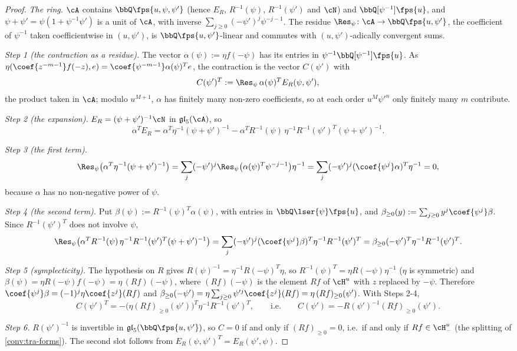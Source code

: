 \begin{proof}
\emph{The ring.} $\cA$ contains $\bbQ\fps{u,\psi,\psi'}$ (hence $E_R$, $R^{-1}(\psi)$, $R^{-1}(\psi')$ and $\cN$) and $\bbQ[\psi^{-1}]\fps{u}$, and $\psi+\psi' = \psi(1+\psi^{-1}\psi')$ is a unit of $\cA$, with inverse $\sum_{j\geq 0}(-\psi')^j\psi^{-j-1}$. The residue $\Res_\psi\colon\cA\to\bbQ\fps{u,\psi'}$, the coefficient of $\psi^{-1}$ taken coefficientwise in $(u,\psi')$, is $\bbQ\fps{u,\psi'}$-linear and commutes with $(u,\psi')$-adically convergent sums.

\emph{Step 1 (the contraction as a residue).} The vector $\alpha(\psi) := \eta f(-\psi)$ has its entries in $\psi^{-1}\bbQ[\psi^{-1}]\fps{u}$. As $\eta(\coef{z^{-m-1}}f(-z),e) = \coef{\psi^{-m-1}}\alpha(\psi)^Te$, the contraction is the vector $C(\psi')$ with
\[
C(\psi')^T := \Res_\psi\,\alpha(\psi)^TE_R(\psi,\psi'),
\]
the product taken in $\cA$; modulo $u^{M+1}$, $\alpha$ has finitely many non-zero coefficients, so at each order $u^M\psi'^n$ only finitely many $m$ contribute.

\emph{Step 2 (the expansion).} $E_R = (\psi+\psi')^{-1}\cN$ in $\mathfrak{gl}_5(\cA)$, so
\[
\alpha^TE_R = \alpha^T\eta^{-1}(\psi+\psi')^{-1}-\alpha^TR^{-1}(\psi)\,\eta^{-1}R^{-1}(\psi')^T(\psi+\psi')^{-1} .
\]

\emph{Step 3 (the first term).}
\[
\Res_\psi\bigl(\alpha^T\eta^{-1}(\psi+\psi')^{-1}\bigr) = \sum_j(-\psi')^j\Res_\psi\bigl(\alpha(\psi)^T\psi^{-j-1}\bigr)\eta^{-1} = \sum_j(-\psi')^j(\coef{\psi^j}\alpha)^T\eta^{-1} = 0,
\]
because $\alpha$ has no non-negative power of $\psi$.

\emph{Step 4 (the second term).} Put $\beta(\psi) := R^{-1}(\psi)^T\alpha(\psi)$, with entries in $\bbQ\lser{\psi}\fps{u}$, and $\beta_{\geq 0}(y) := \sum_{j\geq 0}y^j\coef{\psi^j}\beta$. Since $R^{-1}(\psi')^T$ does not involve $\psi$,
\[
\Res_\psi\bigl(\alpha^TR^{-1}(\psi)\,\eta^{-1}R^{-1}(\psi')^T(\psi+\psi')^{-1}\bigr) = \sum_j(-\psi')^j(\coef{\psi^j}\beta)^T\eta^{-1}R^{-1}(\psi')^T = \beta_{\geq 0}(-\psi')^T\eta^{-1}R^{-1}(\psi')^T .
\]

\emph{Step 5 (symplecticity).} The hypothesis on $R$ gives $R(\psi)^{-1} = \eta^{-1}R(-\psi)^T\eta$, so $R^{-1}(\psi)^T = \eta R(-\psi)\eta^{-1}$ ($\eta$ is symmetric) and $\beta(\psi) = \eta R(-\psi)f(-\psi) = \eta\,(Rf)(-\psi)$, where $(Rf)(-\psi)$ is the element $Rf$ of $\cH^u$ with $z$ replaced by $-\psi$. Therefore $\coef{\psi^j}\beta = (-1)^j\eta\coef{z^j}(Rf)$ and $\beta_{\geq 0}(-\psi') = \eta\sum_{j\geq 0}\psi'^j\coef{z^j}(Rf) = \eta\,(Rf)_{\geq 0}(\psi')$. With Steps 2-4,
\[
C(\psi')^T = -\bigl(\eta(Rf)_{\geq 0}(\psi')\bigr)^T\eta^{-1}R^{-1}(\psi')^T,\qquad\text{i.e.}\qquad C(\psi') = -R(\psi')^{-1}(Rf)_{\geq 0}(\psi').
\]

\emph{Step 6.} $R(\psi')^{-1}$ is invertible in $\mathfrak{gl}_5(\bbQ\fps{u,\psi'})$, so $C = 0$ if and only if $(Rf)_{\geq 0} = 0$, i.e.\ if and only if $Rf\in\cH^u_-$ (the splitting of \cref{conv:tra-forms}). The second slot follows from $E_R(\psi,\psi')^T = E_R(\psi',\psi)$.
\end{proof}

